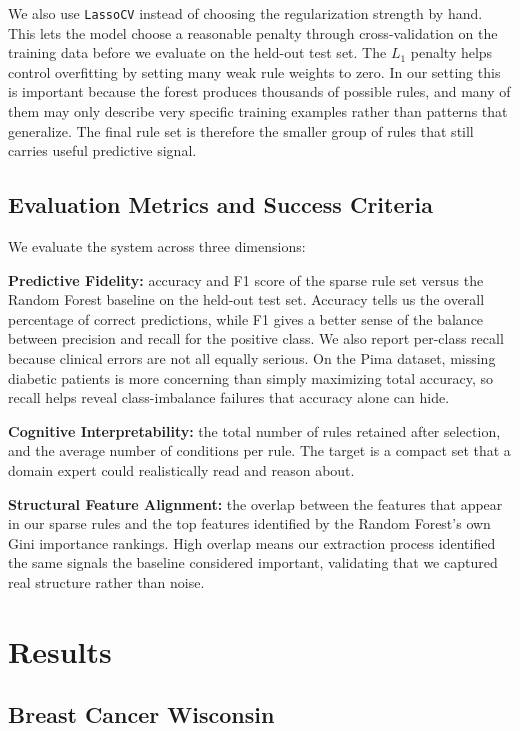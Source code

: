 \documentclass[11pt]{article}
\begin{document}
We also use \texttt{LassoCV} instead of choosing the regularization strength by hand. This lets the model choose a reasonable penalty through cross-validation on the training data before we evaluate on the held-out test set. The $L_1$ penalty helps control overfitting by setting many weak rule weights to zero. In our setting this is important because the forest produces thousands of possible rules, and many of them may only describe very specific training examples rather than patterns that generalize. The final rule set is therefore the smaller group of rules that still carries useful predictive signal.

\subsection{Evaluation Metrics and Success Criteria}

We evaluate the system across three dimensions:

\textbf{Predictive Fidelity:} accuracy and F1 score of the sparse rule set versus the Random Forest baseline on the held-out test set. Accuracy tells us the overall percentage of correct predictions, while F1 gives a better sense of the balance between precision and recall for the positive class. We also report per-class recall because clinical errors are not all equally serious. On the Pima dataset, missing diabetic patients is more concerning than simply maximizing total accuracy, so recall helps reveal class-imbalance failures that accuracy alone can hide.

\textbf{Cognitive Interpretability:} the total number of rules retained after selection, and the average number of conditions per rule. The target is a compact set that a domain expert could realistically read and reason about.

\textbf{Structural Feature Alignment:} the overlap between the features that appear in our sparse rules and the top features identified by the Random Forest's own Gini importance rankings. High overlap means our extraction process identified the same signals the baseline considered important, validating that we captured real structure rather than noise.

\section{Results}

\subsection{Breast Cancer Wisconsin}
\end{document}
